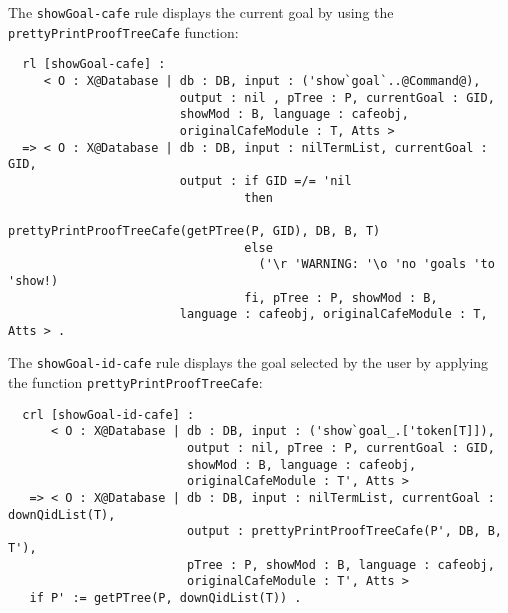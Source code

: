 The \verb"showGoal-cafe" rule displays the current goal by using the
\texttt{prettyPrintProofTreeCafe} function:


{\codesize
\begin{verbatim}
  rl [showGoal-cafe] :
     < O : X@Database | db : DB, input : ('show`goal`..@Command@),
                        output : nil , pTree : P, currentGoal : GID,
                        showMod : B, language : cafeobj,
                        originalCafeModule : T, Atts >
  => < O : X@Database | db : DB, input : nilTermList, currentGoal : GID,
                        output : if GID =/= 'nil
                                 then
                                   prettyPrintProofTreeCafe(getPTree(P, GID), DB, B, T)
                                 else
                                   ('\r 'WARNING: '\o 'no 'goals 'to 'show!)
                                 fi, pTree : P, showMod : B,
                        language : cafeobj, originalCafeModule : T, Atts > .
\end{verbatim}
}

The \verb"showGoal-id-cafe" rule displays the goal selected by the user by applying the
function \texttt{prettyPrintProofTreeCafe}:


{\codesize
\begin{verbatim}
  crl [showGoal-id-cafe] :
      < O : X@Database | db : DB, input : ('show`goal_.['token[T]]),
                         output : nil, pTree : P, currentGoal : GID,
                         showMod : B, language : cafeobj,
                         originalCafeModule : T', Atts >
   => < O : X@Database | db : DB, input : nilTermList, currentGoal : downQidList(T),
                         output : prettyPrintProofTreeCafe(P', DB, B, T'),
                         pTree : P, showMod : B, language : cafeobj,
                         originalCafeModule : T', Atts >
   if P' := getPTree(P, downQidList(T)) .
\end{verbatim}
}
{\codesize
\begin{comment}
  crl [showGoal-id-cafe-error] :
      < O : X@Database | db : DB, input : ('show`goal_.['token[T]]),
                         output : nil, pTree : P, currentGoal : GID,
                         language : cafeobj, Atts >
   => < O : X@Database | db : DB, input : nilTermList, output : ('\r 'WARNING: '\o QIL),
                         pTree : P, currentGoal : GID, language : cafeobj, Atts >
   if ptreeErr(QIL) := getPTree(P, downQidList(T)) .
\end{comment}
}

